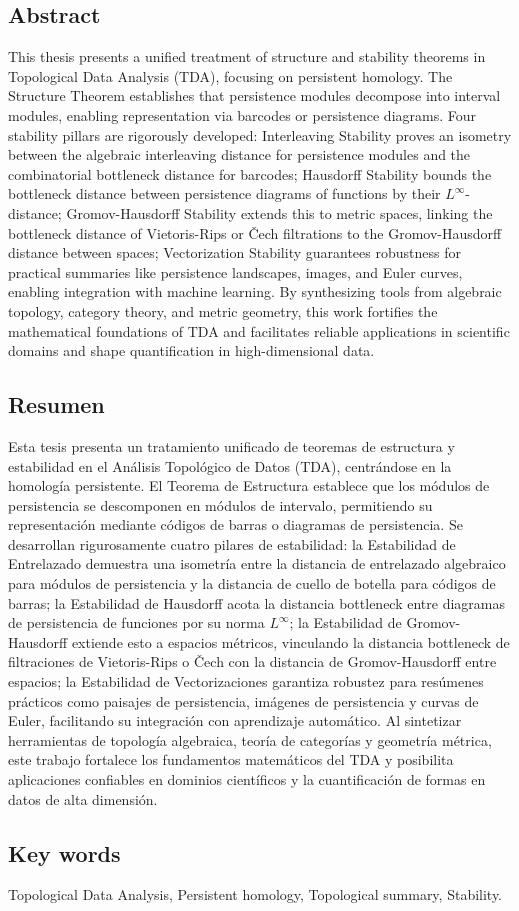 
\subsection*{Abstract}
This thesis presents a unified treatment of structure and stability theorems in Topological Data Analysis (TDA), focusing on persistent homology. The Structure Theorem establishes that persistence modules decompose into interval modules, enabling representation via barcodes or persistence diagrams. Four stability pillars are rigorously developed: Interleaving Stability proves an isometry between the algebraic interleaving distance for persistence modules and the combinatorial bottleneck distance for barcodes; Hausdorff Stability bounds the bottleneck distance between persistence diagrams of functions by their $L^\infty$-distance; Gromov-Hausdorff Stability extends this to metric spaces, linking the bottleneck distance of Vietoris-Rips or Čech filtrations to the Gromov-Hausdorff distance between spaces; Vectorization Stability guarantees robustness for practical summaries like persistence landscapes, images, and Euler curves, enabling integration with machine learning. By synthesizing tools from algebraic topology, category theory, and metric geometry, this work fortifies the mathematical foundations of TDA and facilitates reliable applications in scientific domains and shape quantification in high-dimensional data.

\subsection*{Resumen}
Esta tesis presenta un tratamiento unificado de teoremas de estructura y estabilidad en el Análisis Topológico de Datos (TDA), centrándose en la homología persistente. El Teorema de Estructura establece que los módulos de persistencia se descomponen en módulos de intervalo, permitiendo su representación mediante códigos de barras o diagramas de persistencia. Se desarrollan rigurosamente cuatro pilares de estabilidad: la Estabilidad de Entrelazado demuestra una isometría entre la distancia de entrelazado algebraico para módulos de persistencia y la distancia de cuello de botella para códigos de barras; la Estabilidad de Hausdorff acota la distancia bottleneck entre diagramas de persistencia de funciones por su norma $ L^\infty $; la Estabilidad de Gromov-Hausdorff extiende esto a espacios métricos, vinculando la distancia bottleneck de filtraciones de Vietoris-Rips o Čech con la distancia de Gromov-Hausdorff entre espacios; la Estabilidad de Vectorizaciones garantiza robustez para resúmenes prácticos como paisajes de persistencia, imágenes de persistencia y curvas de Euler, facilitando su integración con aprendizaje automático. Al sintetizar herramientas de topología algebraica, teoría de categorías y geometría métrica, este trabajo fortalece los fundamentos matemáticos del TDA y posibilita aplicaciones confiables en dominios científicos y la cuantificación de formas en datos de alta dimensión.


\subsection*{Key words}
Topological Data Analysis, Persistent homology, Topological summary, Stability.
